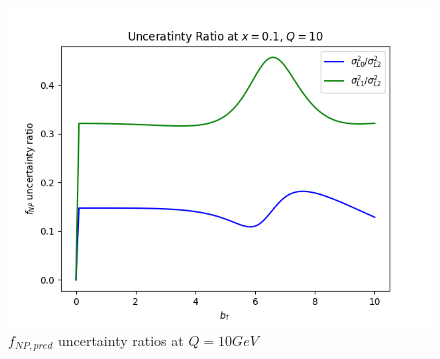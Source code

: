 \documentclass{article}
\begin{document}
\begin{itemize}
\begin{figure}[H]
\begin{minipage}{0.45\textwidth}
        \includegraphics[width=\textwidth]{Images/unc_ratios/unc_ratio_f_NP_Q_10_x_0.1.png}
        \caption{$x=0.1$}
    \end{minipage}
    \caption{$f_{NP, pred}$ uncertainty ratios at $Q = 10 GeV$}
    \end{figure}


\end{itemize}
\end{document}
